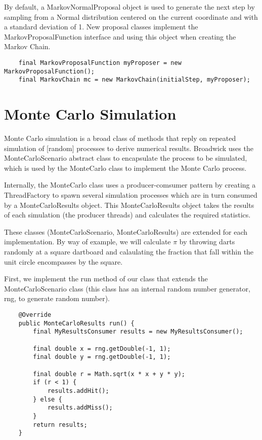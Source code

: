 By default, a MarkovNormalProposal object is used to generate the next step by sampling from a Normal distribution centered on the current coordinate and with a standard deviation of 1. New proposal classes implement the MarkovProposalFunction interface and using this object when creating the Markov Chain.

\begin{lstlisting}
    final MarkovProposalFunction myProposer = new MarkovProposalFunction();
    final MarkovChain mc = new MarkovChain(initialStep, myProposer);
\end{lstlisting}


\section{Monte Carlo Simulation}
Monte Carlo simulation is a broad class of methods that reply on repeated simulation of [random] processes to derive numerical results. Broadwick uses the MonteCarloScenario abstract class to encapsulate the process to be simulated, which is used by the MonteCarlo class to implement the Monte Carlo process.

Internally, the MonteCarlo class uses a producer-comsumer pattern by creating a ThreadFactory to spawn several simulation processes which are in turn consumed by a MonteCarloResults object. This MonteCarloResults object takes the results of each simulation (the producer threads) and calculates the required statistics.

These classes (MonteCarloScenario, MonteCarloResults) are extended for each implementation. By way of example, we will calculate $\pi$\index{$\pi$} by throwing darts randomly at a square dartboard and calaulating the fraction that fall within the unit circle encompasses by the square.

First, we implement the run method of our class that extends the MonteCarloScenario class (this class has an internal random number generator, rng, to generate random number).
\begin{lstlisting}
    @Override
    public MonteCarloResults run() {
        final MyResultsConsumer results = new MyResultsConsumer();

        final double x = rng.getDouble(-1, 1);
        final double y = rng.getDouble(-1, 1);

        final double r = Math.sqrt(x * x + y * y);
        if (r < 1) {
            results.addHit();
        } else {
            results.addMiss();
        }
        return results;
    }
\end{lstlisting}

